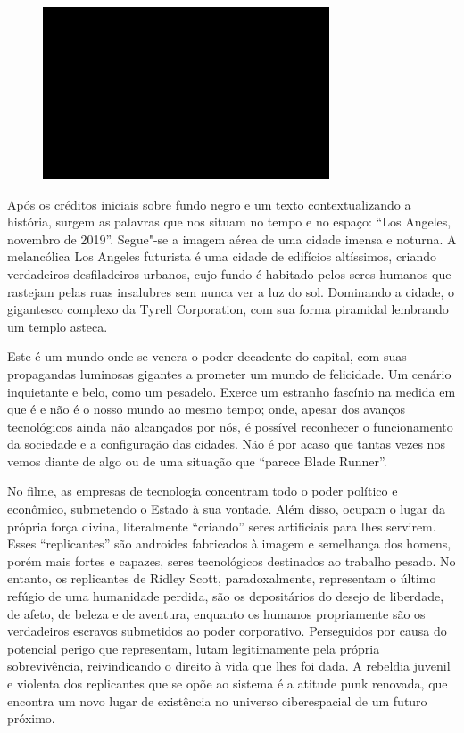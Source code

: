 \begin{figure}[!ht]
\centering
 \includegraphics[width=85mm]{./imgs/im1.jpg}
\caption{\tiny{}}
\end{figure}

Após os créditos iniciais sobre fundo negro e um texto contextualizando
a história, surgem as palavras que nos situam no tempo e no espaço:
``Los Angeles, novembro de 2019''. Segue"-se a imagem aérea de uma cidade
imensa e noturna. A melancólica Los Angeles futurista é uma cidade de
edifícios altíssimos, criando verdadeiros desfiladeiros urbanos, cujo
fundo é habitado pelos seres humanos que rastejam pelas ruas insalubres
sem nunca ver a luz do sol. Dominando a cidade, o gigantesco complexo da
Tyrell Corporation, com sua forma piramidal lembrando um templo asteca.

Este é um mundo onde se venera o poder decadente do capital, com suas
propagandas luminosas gigantes a prometer um mundo de felicidade. Um
cenário inquietante e belo, como um pesadelo. Exerce um estranho
fascínio na medida em que é e não é o nosso mundo ao mesmo tempo; onde,
apesar dos avanços tecnológicos ainda não alcançados por nós, é possível
reconhecer o funcionamento da sociedade e a configuração das cidades.
Não é por acaso que tantas vezes nos vemos diante de algo ou de uma
situação que ``parece Blade Runner''.

No filme, as empresas de tecnologia concentram todo o poder político e
econômico, submetendo o Estado à sua vontade. Além disso, ocupam o lugar
da própria força divina, literalmente ``criando'' seres artificiais para
lhes servirem. Esses ``replicantes'' são androides fabricados à imagem e
semelhança dos homens, porém mais fortes e capazes, seres
tecnológicos destinados ao trabalho pesado. No entanto, os replicantes
de Ridley Scott, paradoxalmente, representam o último refúgio de uma
humanidade perdida, são os depositários do desejo de liberdade, de
afeto, de beleza e de aventura, enquanto os humanos propriamente são os
verdadeiros escravos submetidos ao poder corporativo. Perseguidos por
causa do potencial perigo que representam, lutam legitimamente pela
própria sobrevivência, reivindicando o direito à vida que lhes foi dada.
A rebeldia juvenil e violenta dos replicantes que se opõe ao sistema é a %
atitude punk renovada, que encontra um novo lugar de existência no
universo ciberespacial de um futuro próximo.

